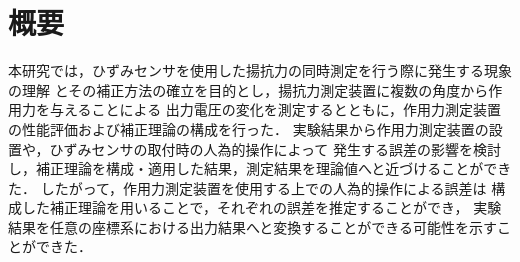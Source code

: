
\maketitle
\section*{概要}

本研究では，ひずみセンサを使用した揚抗力の同時測定を行う際に発生する現象の理解
とその補正方法の確立を目的とし，揚抗力測定装置に複数の角度から作用力を与えることによる
出力電圧の変化を測定するとともに，作用力測定装置の性能評価および補正理論の構成を行った．
実験結果から作用力測定装置の設置や，ひずみセンサの取付時の人為的操作によって
発生する誤差の影響を検討し，補正理論を構成・適用した結果，測定結果を理論値へと近づけることができた．
したがって，作用力測定装置を使用する上での人為的操作による誤差は
構成した補正理論を用いることで，それぞれの誤差を推定することができ，
実験結果を任意の座標系における出力結果へと変換することができる可能性を示すことができた．

\newpage
\setcounter{tocdepth}{2}
\tableofcontents
\newpage

